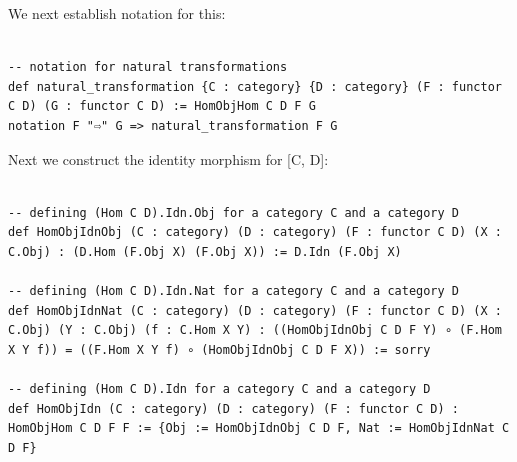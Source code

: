\documentclass{book}
\newcounter{lcounter}
\begin{document}
We next establish notation for this:\\

\begin{center}
\begin{tcolorbox}[width=5in,colback={white},title={\begin{center}\texttt{Lean \thelcounter} \addtocounter{lcounter}{1}  \end{center}},colbacktitle=Blue,coltitle=black]
\begin{verbatim}

-- notation for natural transformations
def natural_transformation {C : category} {D : category} (F : functor C D) (G : functor C D) := HomObjHom C D F G
notation F "⇨" G => natural_transformation F G

\end{verbatim}%
\end{tcolorbox}
\end{center}

Next we construct the identity morphism for [C, D]:\\

\begin{center}
\begin{tcolorbox}[width=5in,colback={white},title={\begin{center}\texttt{Lean \thelcounter} \addtocounter{lcounter}{1}  \end{center}},colbacktitle=Blue,coltitle=black]
\begin{verbatim}

-- defining (Hom C D).Idn.Obj for a category C and a category D
def HomObjIdnObj (C : category) (D : category) (F : functor C D) (X : C.Obj) : (D.Hom (F.Obj X) (F.Obj X)) := D.Idn (F.Obj X)

-- defining (Hom C D).Idn.Nat for a category C and a category D
def HomObjIdnNat (C : category) (D : category) (F : functor C D) (X : C.Obj) (Y : C.Obj) (f : C.Hom X Y) : ((HomObjIdnObj C D F Y) ∘ (F.Hom X Y f)) = ((F.Hom X Y f) ∘ (HomObjIdnObj C D F X)) := sorry

-- defining (Hom C D).Idn for a category C and a category D
def HomObjIdn (C : category) (D : category) (F : functor C D) : HomObjHom C D F F := {Obj := HomObjIdnObj C D F, Nat := HomObjIdnNat C D F}

\end{verbatim}%
\end{tcolorbox}
\end{center}
\end{document}
